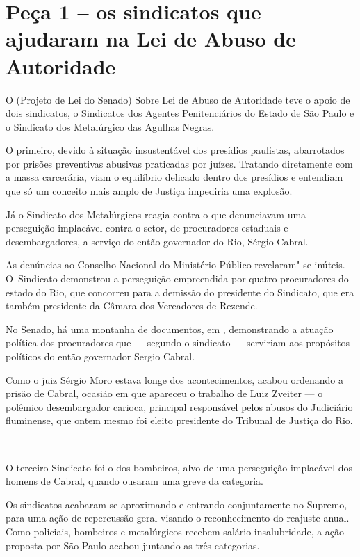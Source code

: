  

\section{Peça 1 -- os sindicatos que ajudaram na Lei de Abuso de
Autoridade}

O  (Projeto de Lei do Senado) Sobre Lei de Abuso de Autoridade teve o
apoio de dois sindicatos, o Sindicatos dos Agentes Penitenciários do
Estado de São Paulo e o Sindicato dos Metalúrgico das Agulhas Negras.

O primeiro, devido à situação insustentável dos presídios paulistas,
abarrotados por prisões preventivas abusivas praticadas por juízes.
Tratando diretamente com a massa carcerária, viam o equilíbrio delicado
dentro dos presídios e entendiam que só um conceito mais amplo de
Justiça impediria uma explosão.

Já o Sindicato dos Metalúrgicos reagia contra o que denunciavam uma
perseguição implacável contra o setor, de procuradores estaduais e
desembargadores, a serviço do então governador do Rio, Sérgio Cabral.

As denúncias ao Conselho Nacional do Ministério Público revelaram"-se
inúteis. O~Sindicato demonstrou a perseguição empreendida por quatro
procuradores do estado do Rio, que concorreu para a demissão do
presidente do Sindicato, que era também presidente da Câmara dos
Vereadores de Rezende.

No Senado, há uma montanha de documentos, em , demonstrando a atuação
política dos procuradores que --- segundo o sindicato --- serviriam aos
propósitos políticos do então governador Sergio Cabral.

Como o juiz Sérgio Moro estava longe dos acontecimentos, acabou
ordenando a prisão de Cabral, ocasião em que apareceu o trabalho de Luiz
Zveiter --- o polêmico desembargador carioca, principal responsável
pelos abusos do Judiciário fluminense, que ontem mesmo foi eleito
presidente do Tribunal de Justiça do Rio.

\begin{center}~\end{center}


O terceiro Sindicato foi o dos bombeiros, alvo de uma perseguição
implacável dos homens de Cabral, quando ousaram uma greve da categoria.

Os sindicatos acabaram se aproximando e entrando conjuntamente no
Supremo, para uma ação de repercussão geral visando o reconhecimento do
reajuste anual. Como policiais, bombeiros e metalúrgicos recebem salário
insalubridade, a ação proposta por São Paulo acabou juntando as três
categorias.

